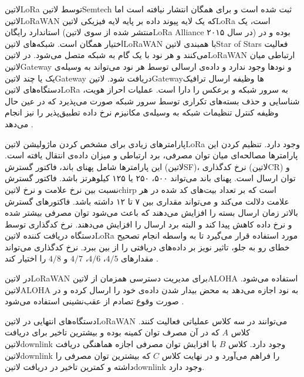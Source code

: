 ‌لاتین{LoRa} توسط ‌لاتین{Semtech} ثبت شده است و برای همگان انتشار نیافته است اما ‌لاتین{LoRaWAN} که یک لایه پیوند داده بر پایه لایه فیزیکی ‌لاتین{LoRa}
است، یک استاندارد رایگان (منتشر شده از سوی ‌لاتین{LoRa Alliance} در سال ۲۰۱۵) بوده و در اختیار همگان است.
شبکه‌های ‌لاتین{LoRaWAN} با همبندی ‌لاتین{Star of Stars} فعالیت می‌کنند و هر نود با یک گام به شبکه متصل می‌شود.
در ‌لاتین{LoRaWAN} ارتباطی میان ‌لاتین{Gateway} و نودها وجود ندارد و داده‌ی ارسالی توسط هر نود می‌تواند به وسیله‌ی یک یا چند ‌لاتین{Gateway} دریافت شود.
‌لاتین{Gateway}ها وظیفه ارسال ترافیک دستگاه‌های ‌لاتین{LoRa} به سرور شبکه و برعکس را دارا است.
عملیات احراز هویت، شناسایی و حذف بسته‌های تکراری توسط سرور شبکه صورت می‌پذیرد که در عین حال وظیفه کنترل
تنظیمات شبکه به وسیله‌ی مکانیزم نرخ داده تطبیق‌پذیر را نیز انجام می‌دهد .

پارامترهای زیادی برای مشخص کردن ماژولیشن ‌لاتین{LoRa} وجود دارد. تنظیم کردن این پارامترها
مصالحه‌ای میان توان مصرفی، برد ارتباطی و میزان داده‌ی انتقال یافته است.
این پارامترها شامل پهنای باند، فاکتور گسترش (‌لاتین{SF})، نرخ کدگذاری (‌لاتین{CR}) و توان ارسال است.
پهنای باند می‌تواند ۵۰۰، ۲۵۰ یا ۱۲۵ کیلوهرتز باشد.
فاکتور گسترش نسبت بین نرخ علامت و نرخ ‌لاتین{chirp} است که بر تعداد بیت‌های کد شده در هر علامت دلالت می‌کند و می‌تواند مقداری بین ۷ تا ۱۲ داشته باشد.
فاکتورهای گسترش بالاتر زمان ارسال بسته را افزایش می‌دهند که باعث می‌شود توان مصرفی بیشتر شده و نرخ داده کاهش پیدا کند و البته برد ارسال را افزایش می‌دهند.
نرخ کدگذاری توسط دستگاه دریافت کننده ‌لاتین{LoRa} مورد استفاده قرار می‌گیرد تا به واسطه انجام تصحیح خطای رو به جلو، تاثیر نویز بر داده‌های دریافتی را از بین ببرد.
نرخ کدگذاری می‌تواند مقدارهای $4/5$، $4/6$، $4/7$ و $4/8$ را اختیار کند
.

در ‌لاتین{LoRaWAN} برای مدیریت دسترسی همزمان از ‌لاتین{ALOHA} استفاده می‌شود.
‌لاتین{ALOHA} به نود اجازه می‌دهد به محض بیدار شدن داده‌ی خود را ارسال کرده و در صورت وقوع تصادم
از عقب‌نشینی استفاده می‌شود
.

دستگاه‌های انتهایی در ‌لاتین{LoRaWAN} می‌توانند در سه کلاس عملیاتی فعالیت کنند. کلاس $A$ که در آن مصرف توان کمینه بوده و بیشترین تاخیر
برای دریافت ‌لاتین{downlink} وجود دارد. کلاس $B$ با افزایش توان مصرفی اجازه هماهنگی دریافت ‌لاتین{downlink} را فراهم می‌آورد
و در نهایت کلاس $C$ که بیشترین توان مصرفی را داشته و کمترین تاخیر در دریافت ‌لاتین{downlink} وجود دارد.

